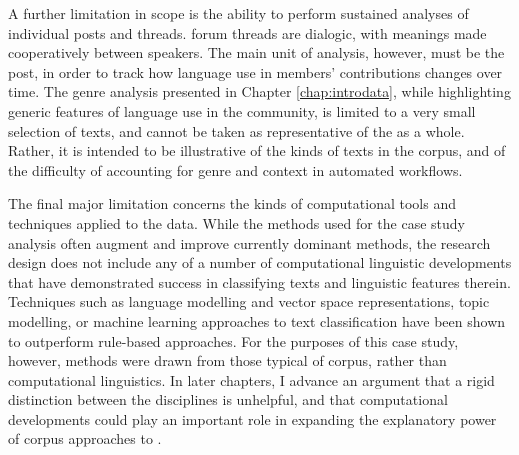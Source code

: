 A further limitation in scope is the ability to perform sustained analyses of individual \glspl{post} and \glspl{thread}. \Gls{forum} \glspl{thread} are dialogic, with meanings made cooperatively between speakers. The main unit of analysis, however, must be the \gls{post}, in order to track how language use in members' contributions changes over time. The genre analysis presented in Chapter \ref{chap:introdata}, while highlighting generic features of language use in the community, is limited to a very small selection of texts, and cannot be taken as representative of the  as a whole. Rather, it is intended to be illustrative of the kinds of texts in the \gls{corpus}, and of the difficulty of accounting for genre and context in automated workflows.


The final major limitation concerns the kinds of computational tools and techniques applied to the data. While the methods used for the case study analysis often augment and improve currently dominant  methods, the research design does not include any of a number of computational linguistic developments that have demonstrated success in classifying texts and linguistic features therein. Techniques such as language modelling and vector space representations, topic modelling, or machine learning approaches to text classification have been shown to outperform rule-based approaches. For the purposes of this case study, however, methods were drawn from those typical of corpus, rather than computational linguistics. In later chapters, I advance an argument that a rigid distinction between the disciplines is unhelpful, and that computational developments could play an important role in expanding the explanatory power of corpus approaches to .


